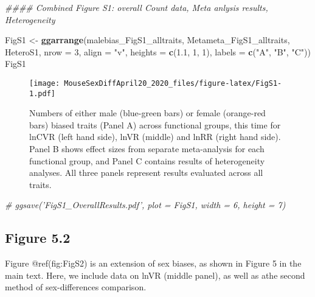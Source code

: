 \documentclass[]{article}
\newenvironment{Shaded}{\begin{snugshade}}{\end{snugshade}}
\newcommand{\CommentTok}[1]{\textcolor[rgb]{0.56,0.35,0.01}{\textit{#1}}}
\newcommand{\DataTypeTok}[1]{\textcolor[rgb]{0.13,0.29,0.53}{#1}}
\newcommand{\DecValTok}[1]{\textcolor[rgb]{0.00,0.00,0.81}{#1}}
\newcommand{\FloatTok}[1]{\textcolor[rgb]{0.00,0.00,0.81}{#1}}
\newcommand{\KeywordTok}[1]{\textcolor[rgb]{0.13,0.29,0.53}{\textbf{#1}}}
\newcommand{\NormalTok}[1]{#1}
\newcommand{\StringTok}[1]{\textcolor[rgb]{0.31,0.60,0.02}{#1}}
\begin{document}
\begin{Shaded}
\begin{Highlighting}[]
\CommentTok{#### Combined Figure S1: overall Count data, Meta anlysis results, Heterogeneity}

\NormalTok{FigS1 <-}\StringTok{ }\KeywordTok{ggarrange}\NormalTok{(malebias_FigS1_alltraits, Metameta_FigS1_alltraits, HeteroS1, }
    \DataTypeTok{nrow =} \DecValTok{3}\NormalTok{, }\DataTypeTok{align =} \StringTok{"v"}\NormalTok{, }\DataTypeTok{heights =} \KeywordTok{c}\NormalTok{(}\FloatTok{1.1}\NormalTok{, }\DecValTok{1}\NormalTok{, }\DecValTok{1}\NormalTok{), }\DataTypeTok{labels =} \KeywordTok{c}\NormalTok{(}\StringTok{"A"}\NormalTok{, }\StringTok{"B"}\NormalTok{, }\StringTok{"C"}\NormalTok{))}
\NormalTok{FigS1}
\end{Highlighting}
\end{Shaded}

\begin{figure}
\centering
\texttt{[image: MouseSexDiffApril20\_2020\_files/figure-latex/FigS1-1.pdf]}
\caption{Numbers of either male (blue-green bars) or female (orange-red
bars) biased traits (Panel A) across functional groups, this time for
lnCVR (left hand side), lnVR (middle) and lnRR (right hand side). Panel
B shows effect sizes from separate meta-analysis for each functional
group, and Panel C contains results of heterogeneity analyses. All three
panels represent results evaluated across all traits.}
\end{figure}

\begin{Shaded}
\begin{Highlighting}[]
\CommentTok{# ggsave('FigS1_OverallResults.pdf', plot = FigS1, width = 6, height = 7)}
\end{Highlighting}
\end{Shaded}

\hypertarget{figure-5.2}{%
\subsection{Figure 5.2}\label{figure-5.2}}

Figure @ref(fig:FigS2) is an extension of sex biases, as shown in Figure
5 in the main text. Here, we include data on lnVR (middle panel), as
well as athe second method of sex-differences comparison.
\end{document}
